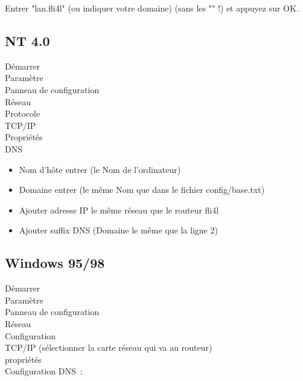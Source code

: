   Entrer "lan.fli4l" (ou indiquer votre domaine) (sans les "" !)
  \pfeil et appuyez sur OK.

\subsection{NT 4.0}

  Démarrer \pfeil\\
  \hspace*{2ex}Paramètre \pfeil\\
  \hspace*{4ex}Panneau de configuration  \pfeil\\
  \hspace*{6ex}Réseau \pfeil\\
  \hspace*{8ex}Protocole \pfeil\\
  \hspace*{10ex}TCP/IP \pfeil\\
  \hspace*{12ex}Propriétés \pfeil\\
  \hspace*{14ex}DNS \pfeil\\
  \hspace{16ex}\begin{itemize}
  \item Nom d'hôte entrer (le Nom de l'ordinateur)
  \item Domaine entrer (le même Nom que dans le fichier config/base.txt)
  \item Ajouter adresse IP le même réseau que le routeur fli4l
  \item Ajouter suffix DNS (Domaine le même que la ligne 2)
  \end{itemize}

\subsection{Windows 95/98}

  Démarrer \pfeil\\
  \hspace*{2ex}Paramètre \pfeil\\
  \hspace*{4ex}Panneau de configuration \pfeil\\
  \hspace*{6ex}Réseau \pfeil\\
  \hspace*{8ex}Configuration \pfeil\\
  \hspace*{10ex}TCP/IP (sélectionner la carte réseau qui va au routeur) \pfeil\\
  \hspace*{12ex}propriétés \pfeil\\
  \hspace*{14ex}Configuration DNS~:

